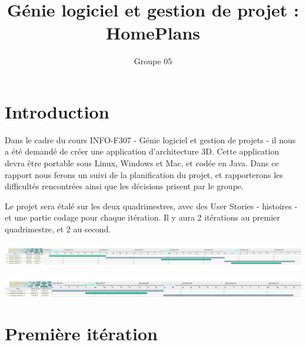 \documentclass[a4paper, 12pt]{report}
\title{Génie logiciel et gestion de projet : \\ HomePlans}
\author{Groupe 05}
\begin{document}
\maketitle
	\chapter{Introduction}
		Dans le cadre du cours INFO-F307 - Génie logiciel et gestion de projets - il nous a été demandé de créer une application d'architecture 3D. Cette application devra être portable sous Linux, Windows et Mac, et codée en Java. Dans ce rapport nous ferons un suivi de la planification du projet, et rapporterons les difficultés rencontrées ainsi que les décisions prisent par le groupe.
		
		Le projet sera étalé sur les deux quadrimestres, avec des User Stories - histoires - et une partie codage pour chaque itération. Il y aura 2 itérations au premier quadrimestre, et 2 au second.
		
		\begin{center}
			\includegraphics[scale=0.13]{images/gantt_projet_1er_quadri.png}
		\end{center}
		
		\begin{center}
			\includegraphics[scale=0.16]{images/gantt_projet_2eme_quadri.png}
		\end{center}
		
		
	\chapter{Première itération}
\end{document}
